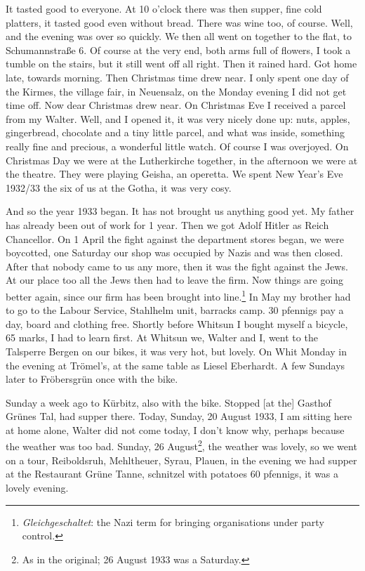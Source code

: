 \documentclass[a5paper,11pt,openany]{book}
\newcommand{\seite}[1]{\leavevmode\marginpar{\footnotesize\itshape\raggedright #1}\ignorespaces}
\begin{document}
It tasted good to everyone.
At 10 o'clock there was then
\seite{18}
supper, fine cold platters, it tasted good even without bread.
There was wine too, of course.
Well, and the evening was over so quickly.
We then all went on together to the flat, to Schumannstraße 6.
Of course at the very end, both arms full of flowers, I took a tumble on the stairs, but it still went off all right.
Then it rained hard.
Got home late, towards morning.
Then Christmas time drew near.
I only spent one day of the Kirmes, the village fair, in Neuensalz, on the Monday evening
\seite{19}
I did not get time off.
Now dear Christmas drew near.
On Christmas Eve I received a parcel from my Walter.
Well, and I opened it, it was very nicely done up: nuts, apples, gingerbread, chocolate and a tiny little parcel,
  and what was inside, something really fine and precious, a wonderful little watch.
Of course I was overjoyed.
On Christmas Day we were at the Lutherkirche together, in the afternoon we were at the theatre.
They were playing Geisha, an operetta.
We spent New Year's Eve 1932/33
\seite{20}
the six of us at the Gotha, it was very cosy.

And so the year 1933 began.
It has not brought us anything good yet.
My father has already been out of work for 1 year.
Then we got Adolf Hitler as Reich Chancellor.
On 1 April the fight against the department stores began, we were boycotted,
  one Saturday our shop was occupied by Nazis and was then closed.
After that nobody came to us any more, then it was the fight against the Jews.
At our place too all the Jews then had to leave the firm.
Now things are going better again, since
\seite{21}
our firm has been brought into line.\footnote{\emph{Gleichgeschaltet}: the Nazi term for bringing organisations under party control.}
In May my brother had to go to the Labour Service, Stahlhelm unit, barracks camp.
30 pfennigs pay a day, board and clothing free.
Shortly before Whitsun I bought myself a bicycle, 65 marks, I had to learn first.
At Whitsun we, Walter and I, went to the Talsperre Bergen on our bikes, it was very hot, but lovely.
On Whit Monday in the evening at Trömel's, at the same table as Liesel Eberhardt.
A few Sundays later to Fröbersgrün once with the bike.

\seite{22}
Sunday a week ago to Kürbitz, also with the bike.
Stopped [at the] Gasthof Grünes Tal, had supper there.
Today, Sunday, 20 August 1933, I am sitting here at home alone,
  Walter did not come today, I don't know why, perhaps because the weather was too bad.
Sunday, 26 August\footnote{As in the original; 26 August 1933 was a Saturday.}, the weather was lovely, so we went on a tour, Reiboldsruh, Mehltheuer, Syrau, Plauen,
  in the evening we had supper at the Restaurant Grüne Tanne, schnitzel with potatoes 60 pfennigs, it was a lovely evening.
\end{document}
